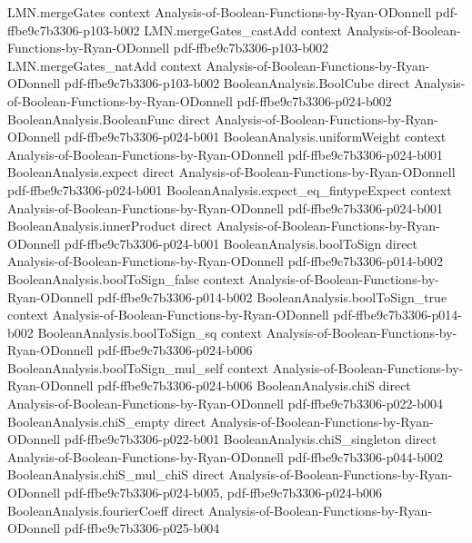 \begin{theorem}
\proofstep
  {LMN.mergeGates}
  {context}
  {Analysis-of-Boolean-Functions-by-Ryan-ODonnell}
  {pdf-ffbe9c7b3306-p103-b002}
\proofstep
  {LMN.mergeGates_castAdd}
  {context}
  {Analysis-of-Boolean-Functions-by-Ryan-ODonnell}
  {pdf-ffbe9c7b3306-p103-b002}
\proofstep
  {LMN.mergeGates_natAdd}
  {context}
  {Analysis-of-Boolean-Functions-by-Ryan-ODonnell}
  {pdf-ffbe9c7b3306-p103-b002}
\proofstep
  {BooleanAnalysis.BoolCube}
  {direct}
  {Analysis-of-Boolean-Functions-by-Ryan-ODonnell}
  {pdf-ffbe9c7b3306-p024-b002}
\proofstep
  {BooleanAnalysis.BooleanFunc}
  {direct}
  {Analysis-of-Boolean-Functions-by-Ryan-ODonnell}
  {pdf-ffbe9c7b3306-p024-b001}
\proofstep
  {BooleanAnalysis.uniformWeight}
  {context}
  {Analysis-of-Boolean-Functions-by-Ryan-ODonnell}
  {pdf-ffbe9c7b3306-p024-b001}
\proofstep
  {BooleanAnalysis.expect}
  {direct}
  {Analysis-of-Boolean-Functions-by-Ryan-ODonnell}
  {pdf-ffbe9c7b3306-p024-b001}
\proofstep
  {BooleanAnalysis.expect_eq_fintypeExpect}
  {context}
  {Analysis-of-Boolean-Functions-by-Ryan-ODonnell}
  {pdf-ffbe9c7b3306-p024-b001}
\proofstep
  {BooleanAnalysis.innerProduct}
  {direct}
  {Analysis-of-Boolean-Functions-by-Ryan-ODonnell}
  {pdf-ffbe9c7b3306-p024-b001}
\proofstep
  {BooleanAnalysis.boolToSign}
  {direct}
  {Analysis-of-Boolean-Functions-by-Ryan-ODonnell}
  {pdf-ffbe9c7b3306-p014-b002}
\proofstep
  {BooleanAnalysis.boolToSign_false}
  {context}
  {Analysis-of-Boolean-Functions-by-Ryan-ODonnell}
  {pdf-ffbe9c7b3306-p014-b002}
\proofstep
  {BooleanAnalysis.boolToSign_true}
  {context}
  {Analysis-of-Boolean-Functions-by-Ryan-ODonnell}
  {pdf-ffbe9c7b3306-p014-b002}
\proofstep
  {BooleanAnalysis.boolToSign_sq}
  {context}
  {Analysis-of-Boolean-Functions-by-Ryan-ODonnell}
  {pdf-ffbe9c7b3306-p024-b006}
\proofstep
  {BooleanAnalysis.boolToSign_mul_self}
  {context}
  {Analysis-of-Boolean-Functions-by-Ryan-ODonnell}
  {pdf-ffbe9c7b3306-p024-b006}
\proofstep
  {BooleanAnalysis.chiS}
  {direct}
  {Analysis-of-Boolean-Functions-by-Ryan-ODonnell}
  {pdf-ffbe9c7b3306-p022-b004}
\proofstep
  {BooleanAnalysis.chiS_empty}
  {direct}
  {Analysis-of-Boolean-Functions-by-Ryan-ODonnell}
  {pdf-ffbe9c7b3306-p022-b001}
\proofstep
  {BooleanAnalysis.chiS_singleton}
  {direct}
  {Analysis-of-Boolean-Functions-by-Ryan-ODonnell}
  {pdf-ffbe9c7b3306-p044-b002}
\proofstep
  {BooleanAnalysis.chiS_mul_chiS}
  {direct}
  {Analysis-of-Boolean-Functions-by-Ryan-ODonnell}
  {pdf-ffbe9c7b3306-p024-b005,
    pdf-ffbe9c7b3306-p024-b006}
\proofstep
  {BooleanAnalysis.fourierCoeff}
  {direct}
  {Analysis-of-Boolean-Functions-by-Ryan-ODonnell}
  {pdf-ffbe9c7b3306-p025-b004}

\end{theorem}
